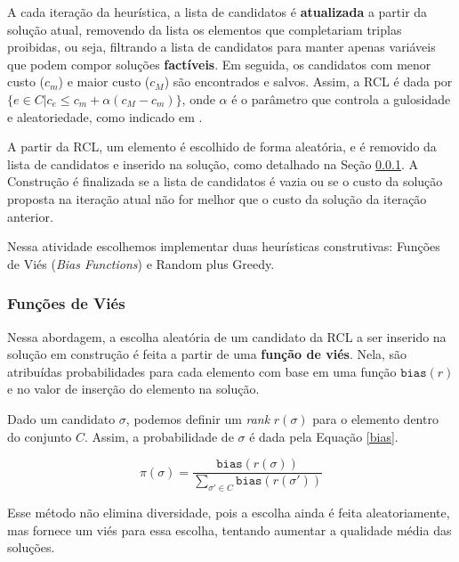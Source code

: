 \documentclass{MO824}
\begin{document}
    A cada iteração da heurística, a lista de candidatos é \textbf{atualizada} a partir da solução atual, removendo da lista os elementos que completariam triplas proibidas, ou seja, filtrando a lista de candidatos para manter apenas variáveis que podem compor soluções \textbf{factíveis}. Em seguida, os candidatos com menor custo ($c_m$) e maior custo ($c_M$) são encontrados e salvos. Assim, a RCL é dada por $\{e \in C | c_e \leq c_m + \alpha(c_M-c_m)\}$, onde $\alpha$ é o parâmetro que controla a gulosidade e aleatoriedade, como indicado em \cite{grasp}. 
    
    A partir da RCL, um elemento é escolhido de forma aleatória, e é removido da lista de candidatos e inserido na solução, como detalhado na Seção \ref{random}. A Construção é finalizada se a lista de candidatos é vazia ou se o custo da solução proposta na iteração atual não for melhor que o custo da solução da iteração anterior.

    Nessa atividade escolhemos implementar duas heurísticas construtivas: Funções de Viés (\textit{Bias Functions}) e Random plus Greedy.
    
    \subsubsection{Funções de Viés} \label{random}
    Nessa abordagem, a escolha aleatória de um candidato da RCL a ser inserido na solução em construção é feita a partir de uma \textbf{função de viés}. Nela, são atribuídas probabilidades para cada elemento com base em uma função $\texttt{bias}(r)$ e no valor de inserção do elemento na solução. 
    
    Dado um candidato $\sigma$, podemos definir um \textit{rank} $r(\sigma)$ para o elemento dentro do conjunto $C$. Assim, a probabilidade de $\sigma$ é dada pela Equação \eqref{bias}.
    
    \begin{equation} \label{bias}
        \pi(\sigma) = \frac{\texttt{bias}(r(\sigma))}{\sum_{\sigma' \in C} \texttt{bias}(r(\sigma'))}
    \end{equation}
    
    Esse método não elimina diversidade, pois a escolha ainda é feita aleatoriamente, mas fornece um viés para essa escolha, tentando aumentar a qualidade média das soluções.
    
\end{document}
